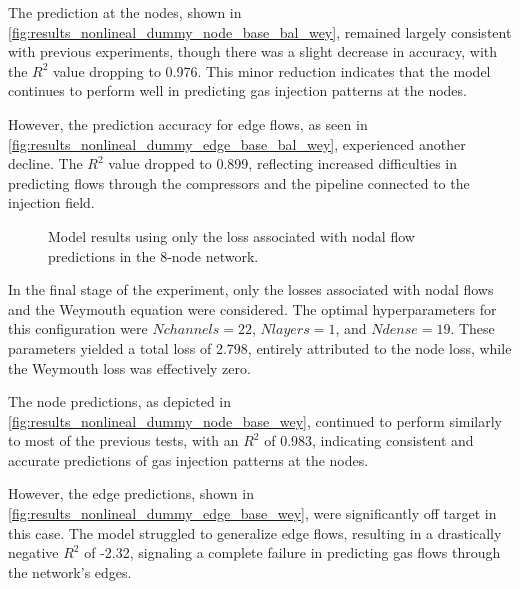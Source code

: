 The prediction at the nodes, shown in \cref{fig:results_nonlineal_dummy_node_base_bal_wey}, remained largely consistent with previous experiments, though there was a slight decrease in accuracy, with the $R^2$ value dropping to 0.976. This minor reduction indicates that the model continues to perform well in predicting gas injection patterns at the nodes.

However, the prediction accuracy for edge flows, as seen in \cref{fig:results_nonlineal_dummy_edge_base_bal_wey}, experienced another decline. The $R^2$ value dropped to 0.899, reflecting increased difficulties in predicting flows through the compressors and the pipeline connected to the injection field. 


\begin{figure}
    \centering
    \setlength{}        
    \setlength{} 
    
    \caption{Model results using only the loss associated with nodal flow predictions in the 8-node network.}
    \label{fig:dummy_base_results}
\end{figure}



In the final stage of the experiment, only the losses associated with nodal flows and the Weymouth equation were considered. The optimal hyperparameters for this configuration were $ N channels=22$, $ N layers=1$, and $ N dense=19$. These parameters yielded a total loss of 2.798, entirely attributed to the node loss, while the Weymouth loss was effectively zero.

The node predictions, as depicted in \cref{fig:results_nonlineal_dummy_node_base_wey}, continued to perform similarly to most of the previous tests, with an $R^2$ of 0.983, indicating consistent and accurate predictions of gas injection patterns at the nodes.

However, the edge predictions, shown in \cref{fig:results_nonlineal_dummy_edge_base_wey}, were significantly off target in this case. The model struggled to generalize edge flows, resulting in a drastically negative $R^2$ of -2.32, signaling a complete failure in predicting gas flows through the network's edges. 

